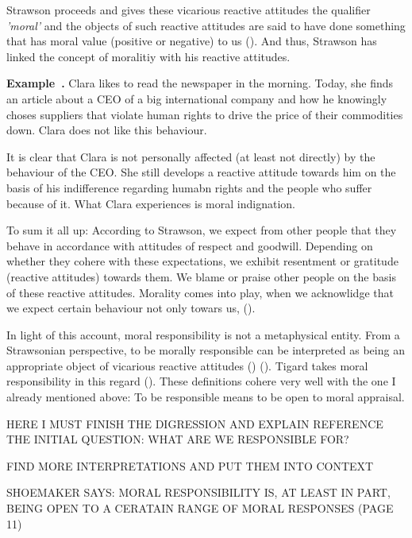\documentclass{article}
\newcounter{example}[section]
\newenvironment{example}[1][]{\refstepcounter{example}\par\medskip
   \noindent \textbf{Example~\theexample. #1} \rmfamily}{\medskip}
\begin{document}
Strawson proceeds and gives these vicarious reactive attitudes the
qualifier \textit{'moral'} and the objects of such reactive attitudes are said
to have done something that has moral value (positive or negative) to us
(\cite[p.15]{Strawson1962}). And thus, Strawson has linked the concept of
moralitiy with his reactive attitudes.


\begin{example}
	Clara likes to read the newspaper in the morning. Today, she finds an
	article about a CEO of a big international company and how he knowingly
	choses suppliers that violate human rights to drive the price of their
	commodities down. Clara does not like this behaviour.
\end{example}


It is clear that Clara is not personally affected (at least not directly) by the
behaviour of the CEO. She still develops a reactive attitude towards him on the
basis of his indifference regarding humabn rights and the people who suffer
because of it. What Clara experiences is moral indignation.

To sum it all up: According to Strawson, we expect from other people that they
behave in accordance with attitudes of respect and goodwill. Depending on
whether they cohere with these expectations, we exhibit resentment or gratitude
(reactive attitudes) towards them. We blame or praise other people on the basis
of these reactive attitudes. Morality comes into play, when we acknowlidge that
we expect certain behaviour not only towars us,  (\cite[p.16]{Strawson1962}).

In light of this account, moral responsibility is not a metaphysical entity.
From a Strawsonian perspective, to be morally responsible can be interpreted as
being an appropriate object of vicarious reactive attitudes
(\cite[p.3]{SmithVickers2021}) (\cite[p.175]{Matthias_2004}). Tigard takes moral
responsibility in this regard  (\cite[p.3]{Tigard_2020}). 
These definitions cohere very well with the one I already mentioned above: To be
responsible means to be open to moral appraisal.

HERE I MUST FINISH THE DIGRESSION AND EXPLAIN REFERENCE THE INITIAL QUESTION:
WHAT ARE WE RESPONSIBLE FOR?

FIND MORE INTERPRETATIONS AND PUT THEM
INTO CONTEXT

SHOEMAKER SAYS: MORAL RESPONSIBILITY IS, AT LEAST IN PART, BEING OPEN TO A
CERATAIN RANGE OF MORAL RESPONSES (PAGE 11)
\end{document}
